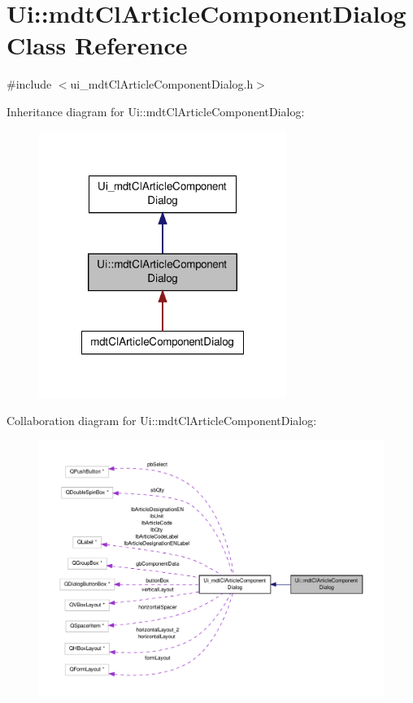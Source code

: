 \hypertarget{class_ui_1_1mdt_cl_article_component_dialog}{\section{Ui\-:\-:mdt\-Cl\-Article\-Component\-Dialog Class Reference}
\label{class_ui_1_1mdt_cl_article_component_dialog}
}


{\ttfamily \#include $<$ui\-\_\-mdt\-Cl\-Article\-Component\-Dialog.\-h$>$}



Inheritance diagram for Ui\-:\-:mdt\-Cl\-Article\-Component\-Dialog\-:\nopagebreak
\begin{figure}[H]
\begin{center}
\leavevmode
\includegraphics[width=228pt]{class_ui_1_1mdt_cl_article_component_dialog__inherit__graph}
\end{center}
\end{figure}


Collaboration diagram for Ui\-:\-:mdt\-Cl\-Article\-Component\-Dialog\-:\nopagebreak
\begin{figure}[H]
\begin{center}
\leavevmode
\includegraphics[width=350pt]{class_ui_1_1mdt_cl_article_component_dialog__coll__graph}
\end{center}
\end{figure}
